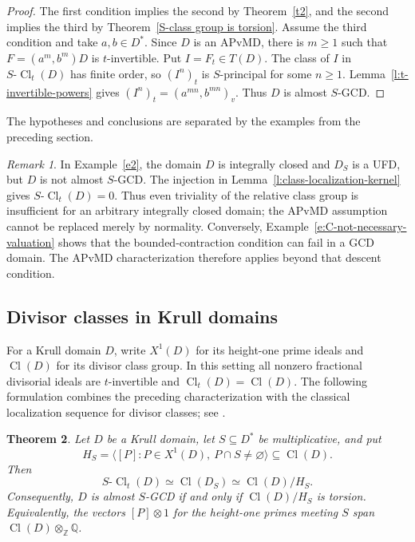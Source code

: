 \documentclass[11pt]{amsart}
\newtheorem{theorem}{Theorem}[section]
\theoremstyle{definition}
\theoremstyle{remark}
\newtheorem{remark}[theorem]{Remark}
\DeclareMathOperator{\Cl}{Cl}
\newcommand{\ZZ}{\mathbb Z}
\newcommand{\QQ}{\mathbb Q}
\begin{document}
\begin{proof}
The first condition implies the second by Theorem~\ref{t2},
and the second implies the third by
Theorem~\ref{S-class group is torsion}.
Assume the third condition and take $a,b\in D^\ast$.
Since $D$ is an APvMD, there is $m\geq1$ such that
$F=(a^m,b^m)D$ is $t$-invertible. Put $I=F_t\in T(D)$.
The class of $I$ in $S\text{-}\Cl_t(D)$ has finite order,
so $(I^n)_t$ is $S$-principal for some $n\geq1$.
Lemma~\ref{l:t-invertible-powers} gives
$(I^n)_t=(a^{mn},b^{mn})_v$. Thus $D$ is almost $S$-GCD.
\end{proof}

The hypotheses and conclusions are separated by the examples from
the preceding section.

\begin{remark}\label{r:class-torsion-limits}
In Example~\ref{e2}, the domain $D$ is integrally closed and $D_S$
is a UFD, but $D$ is not almost $S$-GCD. The injection in
Lemma~\ref{l:class-localization-kernel} gives
$S\text{-}\Cl_t(D)=0$. Thus even triviality of the relative class
group is insufficient for an arbitrary integrally closed domain;
the APvMD assumption cannot be replaced merely by normality.
Conversely, Example~\ref{e:C-not-necessary-valuation} shows that
the bounded-contraction condition can fail in a GCD domain.
The APvMD characterization therefore applies beyond that
descent condition.
\end{remark}

\subsection{Divisor classes in Krull domains}

For a Krull domain $D$, write $X^1(D)$ for its height-one prime
ideals and $\Cl(D)$ for its divisor class group. In this setting
all nonzero fractional divisorial ideals are $t$-invertible and
$\Cl_t(D)=\Cl(D)$. The following formulation combines the
preceding characterization with the classical localization
sequence for divisor classes; see \cite{Fossum}.

\begin{theorem}\label{t:krull-boundary-criterion}
Let $D$ be a Krull domain, let $S\subseteq D^\ast$ be
multiplicative, and put
\[
 H_S=\langle[P]:P\in X^1(D),\ P\cap S\ne\varnothing\rangle
       \subseteq\Cl(D).
\]
Then
\[
 S\text{-}\Cl_t(D)\simeq\Cl(D_S)\simeq\Cl(D)/H_S.
\]
Consequently, $D$ is almost $S$-GCD if and only if
$\Cl(D)/H_S$ is torsion. Equivalently, the vectors $[P]\otimes1$
for the height-one primes meeting $S$ span
$\Cl(D)\otimes_{\ZZ}\QQ$.
\end{theorem}
\end{document}
